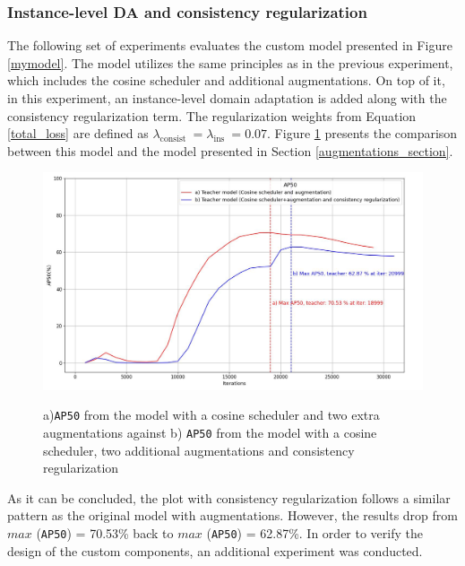 \documentclass[english, 12pt, a4paper, elec, utf8, a-1b, online]{aaltothesis}
\begin{document}
\subsubsection{Instance-level DA and consistency regularization}
The following set of experiments evaluates the custom model presented in Figure \ref{mymodel}. The model utilizes the same principles as in the previous experiment, which includes the cosine scheduler and additional augmentations. On top of it, in this experiment, an instance-level domain adaptation is added along with the consistency regularization term. The regularization weights from Equation \ref{total_loss} are defined as $\lambda_{\text {consist }} = \lambda_{\text {ins }} = 0.07$. Figure \ref{myModel_experiment} presents the comparison between this model and the model presented in Section \ref{augmentations_section}.

\begin{figure}[htb]
	\begin{center}
		\includegraphics[width=14cm]{./AP50_Augm_consistency.jpg}
	\end{center}
	\caption{a)\texttt{AP50} from the model with a cosine  scheduler and two extra augmentations against b) \texttt{AP50} from the model with a cosine scheduler, two additional augmentations and consistency regularization}
	\begin{center}
		\label{myModel_experiment}
	\end{center}
\end{figure}
\FloatBarrier  

As it can be concluded, the plot with consistency regularization follows a similar pattern as the original model with augmentations. However, the results drop from $max$ (\texttt{AP50}) = 70.53\% back to  $max$ (\texttt{AP50}) = 62.87\%. In order to verify the design of the custom components, an additional experiment was conducted. 
\end{document}
